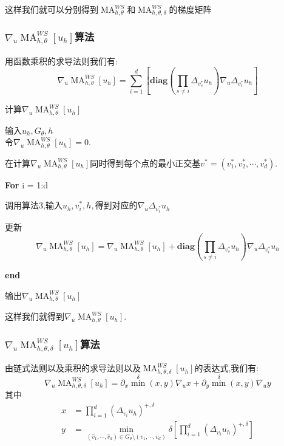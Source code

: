 \documentclass[11pt]{article}
\begin{document}
这样我们就可以分别得到$\operatorname{MA}_{h,\theta}^{WS}$和$\operatorname{MA}_{h,\theta,\delta}^{WS}$的梯度矩阵

\subsubsection{$\nabla{}_u\operatorname{MA}_{h,\theta}^{WS}[u_h]$算法}
用函数乘积的求导法则我们有:
$$\nabla{}_u\operatorname{MA}_{h,\theta}^{WS}[u_h]=\sum_{i=1}^d\left[\textbf{diag}\left(\prod_{s\neq i}\Delta{}_{v^*_s}u_h\right)\nabla{}_u\Delta{}_{v^*_i}u_h\right]$$


\begin{algorithm}[H]
\caption{计算$\nabla{}_u\operatorname{MA}_{h,\theta}^{WS}[u_h]$} 
\begin{algorithmic}[]
\STATE 输入$u_h,G_\theta,h$\\

\STATE 令$\nabla{}_u\operatorname{MA}_{h,\theta}^{WS}[u_h]=0$.

\STATE 在计算$\nabla{}_u\operatorname{MA}_{h,\theta}^{WS}[u_h]$同时得到每个点的最小正交基$v^*=(v^*_1,v^*_2,\cdots{},v^*_d)$.

\STATE \textbf{For} i = 1:d

\STATE  \qquad 调用算法3,输入$u_h,v^*_i,h,$得到对应的$\nabla{}_u\Delta{}_{v^*_i}u_h$

\STATE  \qquad 更新
$$\nabla{}_u\operatorname{MA}_{h,\theta}^{WS}[u_h]=\nabla{}_u\operatorname{MA}_{h,\theta}^{WS}[u_h]+\textbf{diag}\left(\prod_{s\neq i}\Delta{}_{v^*_s}u_h\right)\nabla{}_u\Delta{}_{v^*_i}u_h$$

\STATE  \textbf{end}

\STATE 输出$\nabla{}_u\operatorname{MA}_{h,\theta}^{WS}[u_h]$
\end{algorithmic}
\end{algorithm}

这样我们就得到$\nabla{}_u\operatorname{MA}_{h,\theta}^{WS}[u_h]$.


\subsubsection{$\nabla{}_u\operatorname{MA}_{h,\theta,\delta}^{WS}[u_h]$算法}
由链式法则以及乘积的求导法则以及$\operatorname{MA}_{h,\theta,\delta}^{WS}[u_h]$的表达式,我们有:
$$\nabla{}_u\operatorname{MA}_{h,\theta,\delta}^{WS}[u_h]=\partial_x{\min}^{\delta}(x,y)\nabla{}_u x+\partial_y{\min}^{\delta}(x,y)\nabla{}_u y$$
其中
$$\begin{aligned}
x &= \prod_{i=1}^{d}\left(\Delta_{v_{i}} u_{h}\right)^{+, \delta}\\
y &= \min _{\left(\hat{v}_{1}, \cdots, \hat{v}_{d}\right) \in G_{\theta}\setminus (v_1,\cdots{},v_d)} \delta\left[\prod_{i=1}^{d}\left(\Delta_{v_{i}} u_{h}\right)^{+, \delta}\right]
\end{aligned}$$
\end{document}
